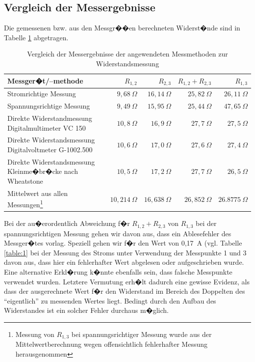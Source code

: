 \documentclass[10pt]{scrartcl}
\begin{document}
\subsection{Vergleich der Messergebnisse}

Die gemessenen bzw. aus den Messgr��en berechneten Widerst�nde sind in Tabelle \ref{table:6} abgetragen.

\begin{table}
\begin{minipage}[t]{\textwidth}
\begin{center}
\begin{tabularx}{\textwidth}{|Xrrrr|}
\hline
    Messger�t/--methode & $R_{1, 2}$  & $R_{2, 3}$ & $R_{1, 2}+R_{2, 3}$ & $R_{1, 3}$ \\
\hline
    Stromrichtige Messung & $9,68~\Omega$ & $16,14~\Omega$ &  $25,82~\Omega$ & $26,11~\Omega$ \\
    Spannungsrichtige Messung & $9,49~\Omega$ & $15,95~\Omega$ & $25,44~\Omega$ & $47,65~\Omega$ \\
    Direkte Widerstandmessung Digitalmultimeter VC 150 & $10,8~\Omega$ & $16,9~\Omega$ & $27,7~\Omega$ & $27,5~\Omega$ \\
    Direkte Widerstandsmessung Digitalvoltmeter G-1002.500 & $10,6~\Omega$ & $17,0~\Omega$ & $27,6~\Omega$ & $27,4~\Omega$ \\
    Direkte Widerstandsmessung Kleinme�br�cke nach Wheatstone & $10,5~\Omega$ & $17,2~\Omega$ & $27,7~\Omega$ & $26,5~\Omega$ \\
    Mittelwert aus allen Messungen\footnote{Messung von $R_{1,3}$ bei spannungsrichtiger Messung wurde aus der Mittelwertberechnung wegen offensichtlich fehlerhafter Messung herausgenommen} & $10,214~\Omega$ & $16,638~\Omega$ & $26,852~\Omega$ & $26.8775~\Omega$ \\
\hline
\end{tabularx}
\end{center}
\end{minipage}
\caption{Vergleich der Messergebnisse der angewendeten Messmethoden zur Widerstandsmessung}
\label{table:6}
\end{table}


Bei der au�erordentlich Abweichung f�r $R_{1, 2}+R_{2, 3}$ von $R_{1, 3}$ bei der spannungsrichtigen Messung gehen wir davon aus, dass ein Ablesefehler des Messger�tes vorlag. Speziell gehen wir f�r den Wert von 0,17~A (vgl. Tabelle \ref{table:1} bei der Messung des Stroms unter Verwendung der Messpunkte 1 und 3 davon aus, dass hier ein fehlerhafter Wert abgelesen oder aufgeschrieben wurde. Eine alternative Erkl�rung k�nnte ebenfalls sein, dass falsche Messpunkte verwendet wurden. Letztere Vermutung erh�lt dadurch eine gewisse Evidenz, als dass der ausgerechnete Wert f�r den Widerstand im Bereich des Doppelten des "`eigentlich"' zu messenden Wertes liegt. Bedingt durch den Aufbau des Widerstandes ist ein solcher Fehler durchaus m�glich. 
\end{document}
